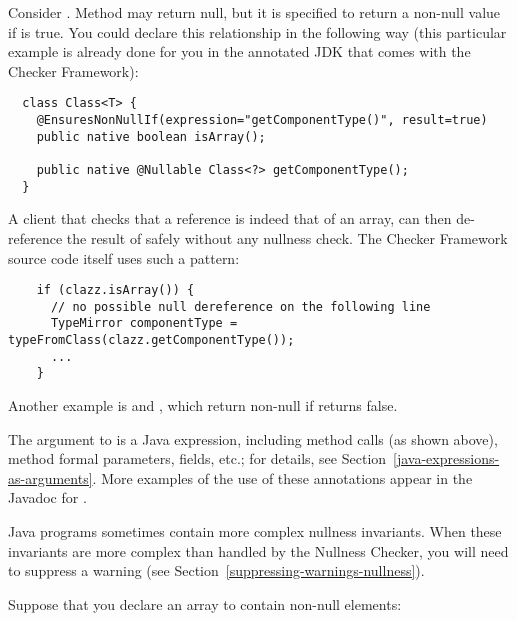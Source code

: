 Consider .
Method
may return null, but it is specified to return a non-null value if
 is
true.
You could declare this relationship in the following way (this particular
example is already
done for you in the annotated JDK that comes with the Checker Framework):

\begin{Verbatim}
  class Class<T> {
    @EnsuresNonNullIf(expression="getComponentType()", result=true)
    public native boolean isArray();

    public native @Nullable Class<?> getComponentType();
  }
\end{Verbatim}

A client that checks that a  reference is indeed that of an array,
can then de-reference the result of  safely
without any nullness check.  The Checker Framework source code itself
uses such a pattern:

\begin{Verbatim}
    if (clazz.isArray()) {
      // no possible null dereference on the following line
      TypeMirror componentType = typeFromClass(clazz.getComponentType());
      ...
    }
\end{Verbatim}

Another example is 
and , which return
non-null if 
returns false.

The argument to  is a Java expression, including method calls
(as shown above), method formal parameters, fields, etc.; for details, see
Section~\ref{java-expressions-as-arguments}.
More examples of the use of these annotations appear in the Javadoc for
.

Java programs sometimes contain more complex nullness invariants.  When
these invariants are more complex than handled by the Nullness Checker, you
will need to suppress a warning (see
Section~\ref{suppressing-warnings-nullness}).



Suppose that you declare an array to contain non-null elements:

